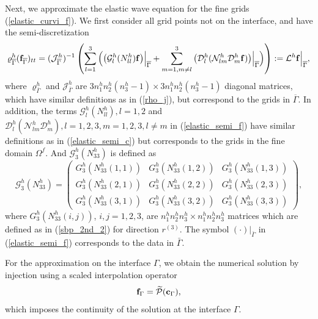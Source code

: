 Next, we approximate the elastic wave equation for the fine grids (\ref{elastic_curvi_f}). We first consider all grid points not on the interface, and have the semi-discretization
\begin{equation}\label{elastic_semi_f}
\varrho^h_{\overline{\Gamma}} ({\bf f}_{\overline{\Gamma}})_{tt} =
( \mathcal{ J}_{\overline{\Gamma}}^{h})^{-1}\left(\sum_{l=1}^3\Big(\big(\mathcal{G}_l^{h}({N}_{ll}^h){\bf f}\big)\Big|_{\overline{\Gamma}}+\sum_{m=1,m\neq l}^3\big(\mathcal{D}_l^{h}(\mathcal{N}_{lm}^{h}\mathcal{D}_m^{h}{\bf f})\big)\Big|_{\overline{\Gamma}}\Big)\right) := \mathcal{L}^h{\bf f}\Big|_{\overline{\Gamma}},
\end{equation}
where ${\varrho}^{h}_{\overline{\Gamma}}$ and ${\mathcal{J}}^{h}_{\overline{\Gamma}}$ are $3n_1^hn_2^h(n_3^h-1)\times 3n_1^hn_2^h(n_3^h-1)$ diagonal matrices, which have similar definitions as in (\ref{rho_j}), but correspond to the grids in $\overline{\Gamma}$. In addition, the terms $\mathcal{G}_l^h({N}_{ll}^h), l = 1,2$ and $\mathcal{D}_l^h(\mathcal{N}_{lm}^h\mathcal{D}_m^h), l=1,2,3,m=1,2,3,l\neq m$ in (\ref{elastic_semi_f}) have similar definitions as in (\ref{elastic_semi_c}) but corresponds to the grids in the fine domain $\Omega^f$. And $\mathcal{G}_3^h({N}_{33}^h)$ is defined as
\[ \mathcal{G}^{h}_3({N}_{33}^h) = \left(\begin{array}{ccc}
G_3^{h}(N_{33}^{h}(1,1)) & G_3^{h}(N_{33}^{h}(1,2))  & G_3^{h}(N_{33}^{h}(1,3)) \\
G_3^{h}(N_{33}^{h}(2,1)) & G_3^{h}(N_{33}^{h}(2,2))  & G_3^{h}(N_{33}^{h}(2,3)) \\
G_3^{h}(N_{33}^{h}(3,1)) & G_3^{h}(N_{33}^{h}(3,2))  & G_3^{h}(N_{33}^{h}(3,3)) \end{array}\right),\]
where ${G}_3^{h}(N_{33}^{h}(i,j))$, $i,j = 1,2,3$, are $n_1^{h}n_2^{h}n_3^{h}\times n_1^{h}n_2^{h}n_3^{h}$ matrices which are defined as in (\ref{sbp_2nd_2}) for direction $r^{(3)}$. The symbol $(\cdot)\big|_{\bar{\Gamma}}$ in (\ref{elastic_semi_f}) corresponds to the data in $\bar{\Gamma}$.


For the approximation on the interface $\Gamma$, we obtain the numerical solution by injection using a scaled interpolation operator
\begin{equation}\label{continuous_sol}
{\bf f}_{\Gamma} = \wt{\mathcal{P}}({\bf c}_{\Gamma}),
\end{equation}
which imposes the continuity of the solution at the interface $\Gamma$. 

